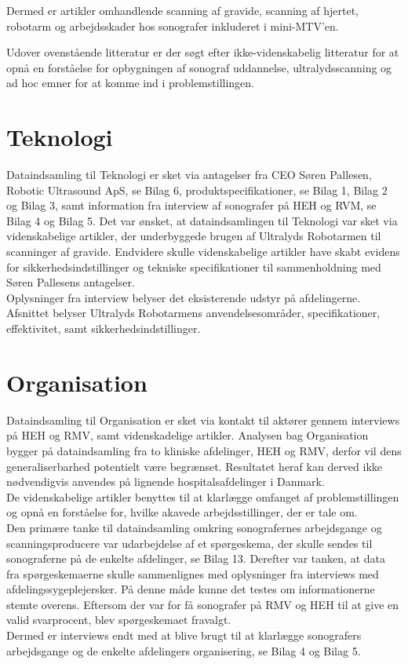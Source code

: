 Dermed er artikler omhandlende scanning af gravide, scanning af hjertet, robotarm og arbejdsskader hos sonografer inkluderet i mini-MTV'en.

Udover ovenstående litteratur er der søgt efter ikke-videnskabelig litteratur for at opnå en forståelse for opbygningen af sonograf uddannelse, ultralydsscanning og ad hoc emner for at komme ind i problemstillingen. 

\section{Teknologi}
Dataindsamling til Teknologi er sket via antagelser fra CEO Søren Pallesen, Robotic Ultrasound ApS, se Bilag 6, produktspecifikationer, se Bilag 1, Bilag 2 og Bilag 3, samt information fra interview af sonografer på HEH og RVM, se Bilag 4 og Bilag 5. Det var ønsket, at dataindsamlingen til Teknologi var sket via videnskabelige artikler, der underbyggede brugen af Ultralyds Robotarmen til scanninger af gravide.
Endvidere skulle videnskabelige artikler have skabt evidens for sikkerhedsindstillinger og tekniske specifikationer til sammenholdning med Søren Pallesens antagelser.\\
Oplysninger fra interview belyser det eksisterende udstyr på afdelingerne. Afsnittet belyser Ultralyds Robotarmens anvendelsesområder, specifikationer, effektivitet, samt sikkerhedsindstillinger.

\section{Organisation}
Dataindsamling til Organisation er sket via kontakt til aktører gennem interviews på HEH og RMV, samt videnskadelige artikler. Analysen bag Organisation bygger på dataindsamling fra to kliniske afdelinger, HEH og RMV, derfor vil dens generaliserbarhed potentielt være begrænset. Resultatet heraf kan derved ikke nødvendigvis anvendes på lignende hospitalsafdelinger i Danmark. \\
De videnskabelige artikler benyttes til at klarlægge omfanget af problemstillingen og opnå en forståelse for, hvilke akavede arbejdsstillinger, der er tale om. \\
Den primære tanke til dataindsamling omkring sonografernes arbejdsgange og scanningsproducere var udarbejdelse af et spørgeskema, der skulle sendes til sonograferne på de enkelte afdelinger, se Bilag 13. Derefter var tanken, at data fra spørgeskemaerne skulle sammenlignes med oplysninger fra interviews med afdelingssygeplejersker. På denne måde kunne det testes om informationerne stemte overens. Eftersom der var for få sonografer på RMV og HEH til at give en valid svarprocent, blev spørgeskemaet fravalgt. \\
Dermed er interviews endt med at blive brugt til at klarlægge sonografers arbejdsgange og de enkelte afdelingers organisering, se Bilag 4 og Bilag 5. 

